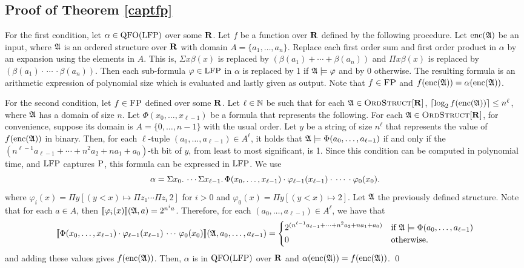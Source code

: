 \subsection{Proof of Theorem \ref{captfp}}

For the first condition, let $\alpha\in{\rm QFO}({\rm LFP})$ over some $\mathbf{R}$. Let $f$ be a function over $\mathbf{R}$ defined by the following procedure. Let ${\rm enc}(\mathfrak{A})$ be an input, where $\mathfrak{A}$ is an ordered structure over $\mathbf{R}$ with domain $A = \{a_1,\ldots,a_n\}$. Replace each first order sum and first order product in $\alpha$ by an expansion using the elements in $A$. This is, $\Sigma x \beta(x)$ is replaced by $(\beta(a_1)+\cdots+\beta(a_n))$ and $\Pi x \beta(x)$ is replaced by $(\beta(a_1)\cdot\,\cdots\,\cdot\beta(a_n))$. Then each sub-formula $\varphi\in{\rm LFP}$ in $\alpha$ is replaced by 1 if $\mathfrak{A}\models\varphi$ and by 0 otherwise. The resulting formula is an arithmetic expression of polynomial size which is evaluated and lastly given as output. Note that $f\in\text{\sc FP}$ and $f({\rm enc}(\mathfrak{A})) = \alpha({\rm enc}(\mathfrak{A}))$.
	
For the second condition, let $f\in \text{\sc FP}$ defined over some $\mathbf{R}$. Let $\ell\in\mathbb{N}$ be such that for each $\mathfrak{A}\in\text{\sc OrdStruct}[\mathbf{R}]$, $\lceil\log_2 f({\rm enc}(\mathfrak{A})) \rceil \leq n^\ell$, where $\mathfrak{A}$ has a domain of size $n$. Let $\Phi(x_0,\ldots,x_{\ell-1})$ be a formula that represents the following. For each $\mathfrak{A} \in \text{\sc OrdStruct}[\mathbf{R}]$, for convenience, suppose its domain is $A = \{0,\ldots,n-1\}$ with the usual order. Let $y$ be a string of size $n^{\ell}$ that represents the value of $f({\rm enc}(\mathfrak{A}))$ in binary. Then, for each $\ell$-tuple $(a_0,\ldots,a_{\ell-1}) \in A^{\ell}$, it holds that $\mathfrak{A} \models \Phi(a_0,\ldots,a_{\ell-1})$ if and only if the $(n^{\ell-1}a_{\ell-1} + \cdots + n^2 a_2 + n a_1 + a_0)$-th bit of $y$, from least to most significant, is 1. Since this condition can be computed in polynomial time, and ${\rm LFP}$ captures $\text{\sc P}$, this formula can be expressed in ${\rm LFP}$. We use
$$
\alpha = \Sigma{x_0}.\, \cdots \Sigma{x_{\ell-1}}.\, \Phi(x_0,\ldots,x_{\ell-1})\cdot\varphi_{\ell-1}(x_{\ell-1})\cdot\,\cdots\,\cdot\varphi_0(x_0).
$$
where $\varphi_i(x) = \Pi y[(y < x)\mapsto\Pi z_1\cdots\Pi z_i\,2]$ for $i > 0$ and $\varphi_0(x) = \Pi y[(y < x)\mapsto 2]$. Let $\mathfrak{A}$ the previously defined structure. Note that for each $a\in A$, then ${\llbracket{}{\varphi_i(x)}\rrbracket}(\mathfrak{A},a) = 2^{n^i a}$. Therefore, for each $(a_0,\ldots,a_{\ell-1})\in A^\ell$, we have that
$$
{\llbracket{}{\Phi(x_0,\ldots,x_{\ell-1})\cdot\varphi_{\ell-1}(x_{\ell-1})\,\cdots\,\varphi_0(x_0)}\rrbracket}(\mathfrak{A},a_0,\ldots,a_{\ell-1}) = 
\begin{cases}
2^{(n^{\ell-1}a_{\ell-1} + \cdots + n^2 a_2 + n a_1 + a_0)} &\text{if } \mathfrak{A}\models\Phi(a_0,\ldots,a_{\ell-1})\\
0 &\text{otherwise.}
\end{cases}
$$
and adding these values gives $f({\rm enc}(\mathfrak{A}))$. Then, $\alpha$ is in ${\rm QFO}({\rm LFP})$ over $\mathbf{R}$ and $\alpha({\rm enc}(\mathfrak{A})) = f({\rm enc}(\mathfrak{A}))$. \qed

